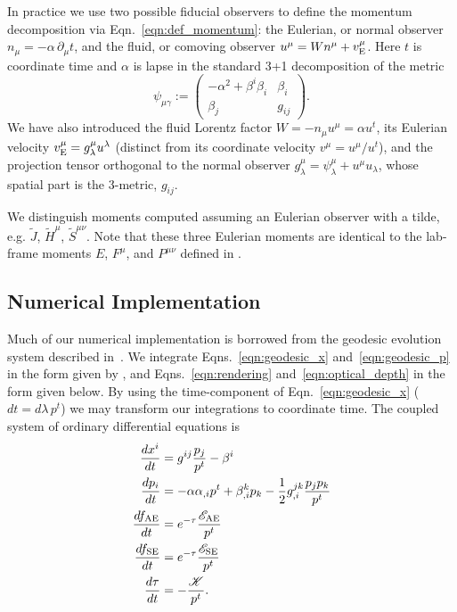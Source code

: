 \documentclass[aps,floatfix,prd,superscriptaddress,twocolumn]{revtex4-1}
\begin{document}
In practice we use two possible fiducial observers to define the momentum
decomposition via Eqn.~\ref{eqn:def_momentum}: the Eulerian,
or normal observer $n_\mu=-\alpha \,\partial_\mu t$,
and the fluid, or comoving observer
$u^\mu=Wn^\mu+v_{\rm E}^\mu$.
Here $t$ is coordinate time and $\alpha$ is lapse
in the standard 3+1 decomposition of the metric
\begin{equation}
  \label{eqn:adm_metric}
  \psi_{\mu\gamma} :=
  \left(
  \begin{matrix}
    -\alpha^2 + \beta^i \beta_i  & \beta_i \\
    \beta_j                      & g_{ij}
  \end{matrix}
  \right).
\end{equation}
We have also introduced
the fluid Lorentz factor $W=-n_\mu u^\mu=\alpha u^t$,
its Eulerian velocity $v_{\rm E}^\mu=g^\mu_\lambda u^\lambda$
(distinct from its coordinate velocity $v^\mu=u^\mu/u^t$),
and the projection tensor orthogonal to the normal observer
$g^\mu_\lambda=\psi^\mu_\lambda+u^\mu u_\lambda$,
whose spatial part is the 3-metric, $g_{ij}$.

We distinguish moments computed assuming an Eulerian observer with a tilde,
e.g. $\tilde{J}$, $\tilde{H}^\mu$, $\tilde{S}^{\mu\nu}$.
Note that these three Eulerian moments are identical to the lab-frame moments
$E$, $F^\mu$, and $P^{\mu\nu}$
defined in
\cite{shib2011-truncated_moment, ocon2015-gr1d_with_nu, fouc2015-m1_nsbh}.

\subsection{Numerical Implementation}
\label{ssec:numerical}
Much of our numerical implementation is borrowed from the geodesic evolution
system described in~\cite{bohn2016-code}.
We integrate Eqns.~\ref{eqn:geodesic_x} and~\ref{eqn:geodesic_p} in the form
given by \citep{hugh1994-eh_finding},
and Eqns.~\ref{eqn:rendering} and~\ref{eqn:optical_depth}
in the form given below.
By using the time-component of Eqn.~\ref{eqn:geodesic_x} ($dt=d\lambda \, p^t$)
we may transform our integrations to coordinate time.
The coupled system of ordinary differential equations is
\begin{align}
  \label{eqn:num_x}
  \frac{dx^i}{dt} &=
  g^{ij} \frac{p_j}{p^t} - \beta^{i}\\
  \label{eqn:num_p}
  \frac{dp_i}{dt} &=
  -\alpha \alpha_{,i} p^t
  + \beta^k_{,i} p_k
  - \frac{1}{2} g^{jk}_{,i}\frac{p_j p_k}{p^t}\\
  \label{eqn:num_fae}
  \frac{df_{\rm AE}}{dt} &=
  e^{-\tau} \frac{\mathscr{E_{\rm AE}}}{p^t}\\
  \label{eqn:num_fse}
  \frac{df_{\rm SE}}{dt} &=
  e^{-\tau} \frac{\mathscr{E_{\rm SE}}}{p^t}\\
  \label{eqn:num_tau}
  \frac{d\tau}{dt} &=
  - \frac{\mathscr{K}}{p^t}.
\end{align}
\end{document}
